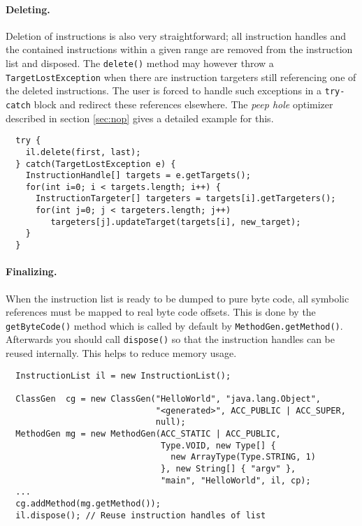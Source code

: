 \documentclass[12pt,twoside]{article}
\begin{document}
\paragraph{Deleting.}
Deletion of instructions is also very straightforward; all instruction
handles and the contained instructions within a given range are
removed from the instruction list and disposed.  The \texttt{delete()}
method may however throw a \texttt{TargetLostException} when there are
instruction targeters still referencing one of the deleted
instructions.  The user is forced to handle such exceptions in a
\texttt{try-catch} block and redirect these references elsewhere. The
\emph{peep hole} optimizer described in section \ref{sec:nop} gives a
detailed example for this.

{\small \begin{verbatim}
  try {
    il.delete(first, last);
  } catch(TargetLostException e) {
    InstructionHandle[] targets = e.getTargets();
    for(int i=0; i < targets.length; i++) {
      InstructionTargeter[] targeters = targets[i].getTargeters();
      for(int j=0; j < targeters.length; j++)
         targeters[j].updateTarget(targets[i], new_target);
    }
  }
\end{verbatim}}

\paragraph{Finalizing.}
When the instruction list is ready to be dumped to pure byte code, all
symbolic references must be mapped to real byte code offsets.  This is
done by the \texttt{getByteCode()} method which is called by default
by \texttt{MethodGen.getMethod()}. Afterwards you should call
\texttt{dispose()} so that the instruction handles can be reused
internally. This helps to reduce memory usage.

\begin{verbatim}
  InstructionList il = new InstructionList();

  ClassGen  cg = new ClassGen("HelloWorld", "java.lang.Object",
                              "<generated>", ACC_PUBLIC | ACC_SUPER,
                              null);
  MethodGen mg = new MethodGen(ACC_STATIC | ACC_PUBLIC,
                               Type.VOID, new Type[] { 
                                 new ArrayType(Type.STRING, 1) 
                               }, new String[] { "argv" },
                               "main", "HelloWorld", il, cp);
  ...
  cg.addMethod(mg.getMethod());
  il.dispose(); // Reuse instruction handles of list
\end{verbatim}
\end{document}
